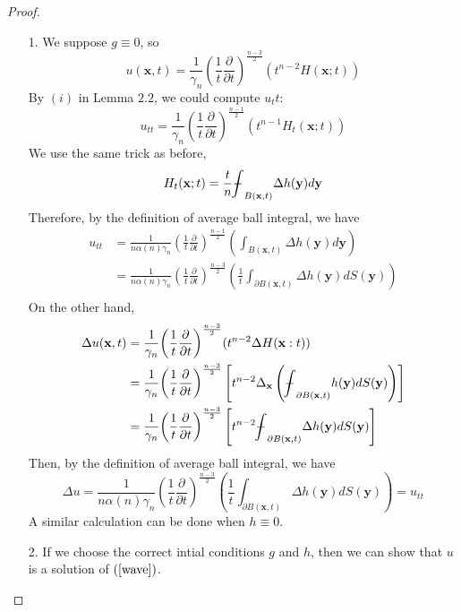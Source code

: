 \documentclass[10pt]{article}
\def\vc{{\mathbf x}}
\def\vcc{{\mathbf y}}
\def\lu{{\Delta  u}}
\def\tp{{\left(\frac{1}{t}\frac{\partial}{\partial t}\right)}}
\newcommand\tbbint{{-\mkern -16mu\int}}
\newcommand\dbbint{{-\mkern -19mu\int}}
\newcommand\bbint{
{\mathchoice{\dbbint}{\tbbint}{\tbbint}{\tbbint}}
}
\begin{document}
\begin{proof}
    \begin{itemize}
        \item [1.] We suppose $g\equiv 0$, so
        \begin{equation}
            \label{g=0}
            u(\vc,t) = \frac{1}{\gamma_n}\left(\frac{1}{t}\frac{\partial}{\partial t}\right)^{\frac{n-3}{2}}\left(t^{n-2}H(\vc;t)\right)
        \end{equation}
        By $(i)$ in Lemma $2.2$, we could compute $u_tt$:
        \begin{equation}
            u_{tt} = \frac{1}{\gamma_n}\left(\frac{1}{t}\frac{\partial}{\partial t}\right)^{\frac{n-1}{2}}\left(t^{n-1}H_{t}(\vc;t)\right)
        \end{equation}
        We use the same trick as before,
        \begin{equation*}
            H_t(\vc;t) = \frac{t}{n}\bbint_{B(\vc,t)} \Delta h(\vcc)d\vcc
        \end{equation*}
        Therefore, by the definition of average ball integral, we have
        \begin{align*}
            u_{tt} &= \frac{1}{n\alpha(n)\gamma_n}\left(\frac{1}{t}\frac{\partial}{\partial t}\right)^{\frac{n-1}{2}}\left(\int_{B(\vc,t)}\Delta h(\vcc)d\vcc\right)\\
            &= \frac{1}{n\alpha(n)\gamma_n}\left(\frac{1}{t}\frac{\partial}{\partial t}\right)^{\frac{n-3}{2}}\left(\frac{1}{t}\int_{\partial B(\vc,t)}\Delta h(\vcc)dS(\vcc)\right)\\
        \end{align*}
        On the other hand,
        \begin{align*}
            \lu (\vc,t) &= \frac{1}{\gamma_n}\tp^{\frac{n-3}{2}}(t^{n-2}\Delta H(\vc:t))\\
                        &= \frac{1}{\gamma_n}\tp^{\frac{n-3}{2}}\left[t^{n-2}\Delta_{\vc}\left(\bbint_{\partial B(\vc,t)}h(\vcc)dS(\vcc)\right)\right]\\
                        &= \frac{1}{\gamma_n}\tp^{\frac{n-3}{2}}\left[t^{n-2}\bbint_{\partial B(\vc,t)}\Delta h(\vcc)dS(\vcc)\right]\\
        \end{align*}
        Then, by the definition of average ball integral, we have
        \begin{equation*}
            \lu = \frac{1}{n\alpha(n)\gamma_n}\tp^{\frac{n-3}{2}}\left(\frac{1}{t}\int_{\partial B(\vc,t)}\Delta h(\vcc)dS(\vcc)\right) = u_{tt}
        \end{equation*}
        A similar calculation can be done when $h\equiv 0$.
        \item [2.] If we choose the correct intial conditions $g$ and $h$, then we can show that $u$ is a solution of $(\ref{wave})$.
    \end{itemize}
\end{proof}
\end{document}
